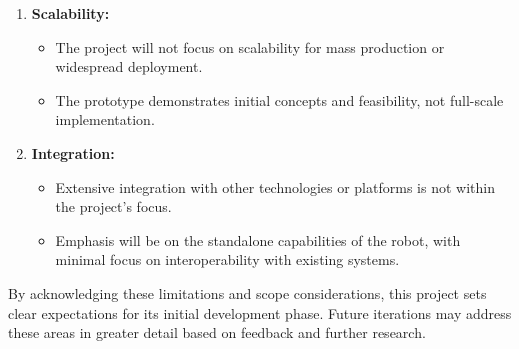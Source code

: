 \begin{enumerate}
    \item\textbf{Scalability:}
        \begin{itemize}
            \item The project will not focus on scalability for mass production or widespread deployment.
            \item The prototype demonstrates initial concepts and feasibility, not full-scale implementation.
        \end{itemize}
    \item\textbf{Integration:}
        \begin{itemize}
            \item Extensive integration with other technologies or platforms is not within the project's focus.
            \item Emphasis will be on the standalone capabilities of the robot, with minimal focus on interoperability with existing systems.
        \end{itemize}
\end{enumerate}

By acknowledging these limitations and scope considerations, this project sets clear expectations for its initial development phase. Future iterations may address these areas in greater detail based on feedback and further research.
